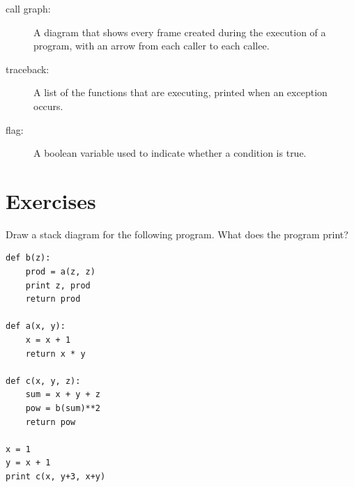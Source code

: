 \documentclass[10pt]{book}
\begin{document}
\begin{description}
\item[call graph:] A diagram that shows every frame created during
the execution of a program, with an arrow from each caller to
each callee. 


\item[traceback:]  A list of the functions that are executing,
printed when an exception occurs.

\item[flag:] A boolean variable used to indicate whether a condition
is true.


\end{description}


\section{Exercises}

\begin{ex}

Draw a stack diagram for the following
program.  What does the program print?

\beforeverb
\begin{verbatim}
def b(z):
    prod = a(z, z)
    print z, prod
    return prod

def a(x, y):
    x = x + 1
    return x * y

def c(x, y, z):
    sum = x + y + z
    pow = b(sum)**2
    return pow

x = 1
y = x + 1
print c(x, y+3, x+y)
\end{verbatim}
\afterverb

\end{ex}
\end{document}
